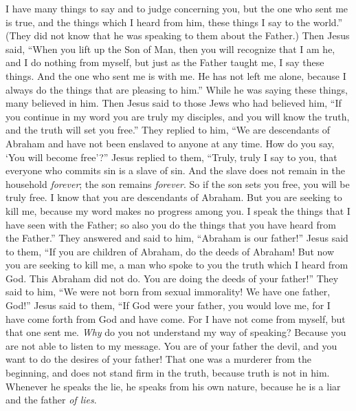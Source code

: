 \begin{biblechapter}
\verse I have many things to say and to judge concerning you, but the one who sent me is true, and the things which I heard from him, these things I say to the world.”
\verse (They did not know that he was speaking to them about the Father.)
\verse Then Jesus said, “When you lift up the Son of Man, then you will recognize that I am he, and I do nothing from myself, but just as the Father taught me, I say these things.
\verse And the one who sent me is with me. He has not left me alone, because I always do the things that are pleasing to him.”
\verse While he was saying these things, many believed in him.
 Then Jesus said to those Jews who had believed him, “If you continue in my word you are truly my disciples,
\verse and you will know the truth, and the truth will set you free.”
\verse They replied to him, “We are descendants of Abraham and have not been enslaved to anyone at any time. How do you say, ‘You will become free’?”
\verse Jesus replied to them, “Truly, truly I say to you, that everyone who commits sin is a slave of sin.
\verse And the slave does not remain in the household \textit{forever}; the son remains \textit{forever}.
\verse So if the son sets you free, you will be truly free.
\verse I know that you are descendants of Abraham. But you are seeking to kill me, because my word makes no progress among you.
\verse I speak the things that I have seen with the Father; so also you do the things that you have heard from the Father.”
 They answered and said to him, “Abraham is our father!” Jesus said to them, “If you are children of Abraham, do the deeds of Abraham!
\verse But now you are seeking to kill me, a man who spoke to you the truth which I heard from God. This Abraham did not do.
\verse You are doing the deeds of your father!”
\verse They said to him, “We were not born from sexual immorality! We have one father, God!”
\verse Jesus said to them, “If God were your father, you would love me, for I have come forth from God and have come. For I have not come from myself, but that one sent me.
\verse \textit{Why} do you not understand my way of speaking? Because you are not able to listen to my message.
\verse You are of your father the devil, and you want to do the desires of your father! That one was a murderer from the beginning, and does not stand firm in the truth, because truth is not in him. Whenever he speaks the lie, he speaks from his own nature, because he is a liar and the father \textit{of lies}.

\end{biblechapter}
